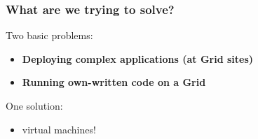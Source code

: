 \documentclass{beamer}
\begin{document}
%
%






\begin{frame}
  \frametitle{What are we trying to solve?}
  \label{sec:1}
  
  Two basic problems:
  \begin{itemize}
  \item \textbf{Deploying complex applications (at Grid sites)}
  \item \textbf{Running own-written code on a Grid}
  \end{itemize}

  \+
  One solution:
  \begin{itemize}
  \item virtual machines!
  \end{itemize}
\end{frame}


  
\end{document}
